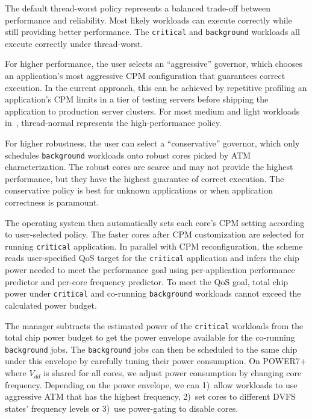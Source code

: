 The default thread-worst policy represents a balanced trade-off between performance and reliability. Most likely workloads can execute correctly while still providing better performance. The \texttt{critical} and \texttt{background} workloads all execute correctly under thread-worst.

For higher performance, the user selects an ``aggressive'' governor, which chooses an application's most aggressive CPM configuration that guarantees correct execution. In the current approach, this can be achieved by repetitive profiling an application's CPM limits in a tier of testing servers before shipping the application to production server clusters. For most medium and light workloads in~, thread-normal represents the high-performance policy.

For higher robustness, the user can select a ``conservative'' governor, which only schedules \texttt{background} workloads onto robust cores picked by ATM characterization. The robust cores are scarce and may not provide the highest performance, but they have the highest guarantee of correct execution. The conservative policy is best for unknown applications or when application correctness is paramount.

The operating system then automatically sets each core's CPM setting according to user-selected policy. The faster cores after CPM customization are selected for running \texttt{critical} application. In parallel with CPM reconfiguration, the scheme reads user-specified QoS target for the \texttt{critical} application and infers the chip power needed to meet the performance goal using per-application performance predictor and per-core frequency predictor. To meet the QoS goal, total chip power under \texttt{critical} and co-running \texttt{background} workloads cannot exceed the calculated power budget.

The manager subtracts the estimated power of the \texttt{critical} workloads from the total chip power budget to get the power envelope available for the co-running \texttt{background} jobs. The \texttt{background} jobs can then be scheduled to the same chip under this envelope by carefully tuning their power consumption. On POWER7+ where $V_{dd}$ is shared for all cores, we adjust power consumption by changing core frequency. Depending on the power envelope, we can 1)~allow workloads to use aggressive ATM that has the highest frequency, 2)~set cores to different DVFS states' frequency levels or 3)~use power-gating to disable cores.

